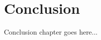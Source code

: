 \documentclass{standalone}
\begin{document}
\chapter{Conclusion}
Conclusion chapter goes here...
\end{document}
